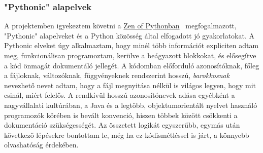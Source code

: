 \documentclass[12pt]{report}
\theoremstyle{definition}
\begin{document}
\subsubsection{"Pythonic" alapelvek}
A projektemben igyekeztem követni a \href{https://peps.python.org/pep-0020/}{Zen of Pythonban}~\cite{peters2004zen} megfogalmazott, "Pythonic" alapelveket és a Python közösség által elfogadott jó gyakorlatokat.
A Pythonic elveket úgy alkalmaztam, hogy minél több információt expliciten adtam meg, funkcionálisan programoztam, kerülve a beágyazott blokkokat, és elősegítve a kód önmagát dokumentáló jellegét. A kódomban előforduló azonosítóknak, főleg a fájloknak, változóknak, függvényeknek rendszerint hosszú, \textit{barokkosnak} nevezhető nevet adtam, hogy a fájl megnyitása nélkül is világos legyen, hogy mit csinál, miért felelős. A rendkívül hosszú azonosítónevek adása egyébként a nagyvállalati kultúrában, a Java és a legtöbb, objektumorientált nyelvet használó programozók körében is bevált konvenció, hiszen többek között csökkenti a dokumentáció szükségességét. Az összetett logikát egyszerűbb, egymás után következő lépésekre bontottam le, még ha ez kódismétléssel is járt, a könnyebb olvashatóság érdekében.
\end{document}
